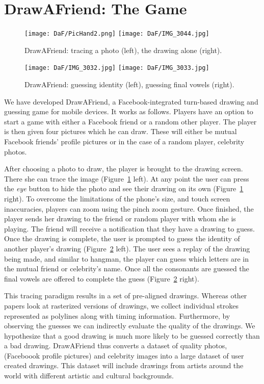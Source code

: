 \section{DrawAFriend: The Game}

\begin{figure}
  \centering%
\texttt{[image: DaF/PicHand2.png]}
\hspace{0.1in}
\texttt{[image: DaF/IMG\_3044.jpg]}
  \caption{DrawAFriend: tracing a photo (left), the drawing alone (right).}
  \label{fig:DaF}
\end{figure}

\begin{figure}
  \centering%
\texttt{[image: DaF/IMG\_3032.jpg]}
\hspace{0.1in}
\texttt{[image: DaF/IMG\_3033.jpg]}
  \caption{DrawAFriend: guessing identity (left), guessing final vowels (right).}
  \label{fig:DaF2}
\end{figure}

We have developed DrawAFriend, a Facebook-integrated turn-based drawing and guessing game for mobile devices.  It works as follows. Players have an option to start a game with either a Facebook friend or a random other player.  The player is then given four pictures which he can draw. These will either be mutual Facebook friends' profile pictures or in the case of a random player, celebrity photos.

After choosing a photo to draw, the player is brought to the drawing screen. There she can trace the image (Figure~\ref{fig:DaF} left). At any point the user can press the {\em eye} button to hide the photo and see their drawing on its own (Figure~\ref{fig:DaF} right). To overcome the limitations of the phone's size, and touch screen inaccuracies, players can zoom using the pinch zoom gesture.
Once finished, the player sends her drawing to the friend or random player with whom she is playing. The friend will receive a notification that they have a drawing to guess. Once the drawing is complete, the user is prompted to guess the identity of another player's drawing (Figure~\ref{fig:DaF2} left). The user sees a replay of the drawing being made, and similar to hangman, the player can guess which letters are in the mutual friend or celebrity's name. Once all the consonants are guessed the final vowels are offered to complete the guess (Figure~\ref{fig:DaF2} right).

This tracing paradigm results in a set of pre-aligned drawings. Whereas other papers look at rasterized versions of drawings, we collect individual strokes represented as polylines along with timing information.  Furthermore, by observing the guesses we can indirectly evaluate the quality of the drawings. We hypothesize that a good drawing is much more likely to be guessed correctly than a bad drawing. DrawAFriend thus converts a dataset of quality photos, (Faceboook profile pictures) and celebrity images into a large dataset of user created drawings. This dataset will include drawings from artists around the world with different artistic and cultural backgrounds.


